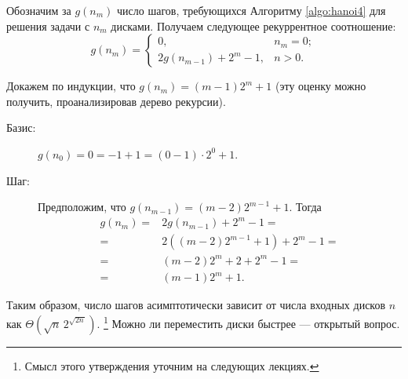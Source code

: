 Обозначим за $g(n_m)$ число шагов, требующихся Алгоритму \ref{algo:hanoi4} для 
решения задачи с $n_m$ дисками. Получаем следующее рекуррентное соотношение:
\[g(n_m) = \begin{cases}
  0, & n_m = 0; \\
  2g(n_{m-1}) + 2^m - 1, & n > 0.
  \end{cases}\]

Докажем по индукции, что $g(n_m) = (m - 1)2^m + 1$ (эту оценку можно получить, 
проанализировав дерево рекурсии).
\begin{description}
  \item[Базис:] $g(n_0) = 0 = -1 + 1 = (0 - 1) \cdot 2^0 + 1$.
  \item[Шаг:] Предположим, что $g(n_{m-1}) = (m - 2)2^{m-1} + 1$. Тогда
  \begin{align*} %
     g(n_m) = {}& 2g(n_{m-1}) + 2^m - 1 = \\
     = {}& 2((m - 2)2^{m-1} + 1) + 2^m - 1 = \\
     = {}& (m - 2)2^m + 2 + 2^m - 1 = \\
     = {}& (m - 1)2^m + 1.
  \end{align*}
\end{description}

Таким образом, число шагов асимптотически зависит от числа входных дисков $n$ 
как $\Theta\left(\sqrt{n}\,2^{\sqrt{2n\,}}\right)$.
\footnote{Смысл этого утверждения уточним на следующих лекциях.} Можно ли 
переместить диски быстрее --- открытый вопрос.
